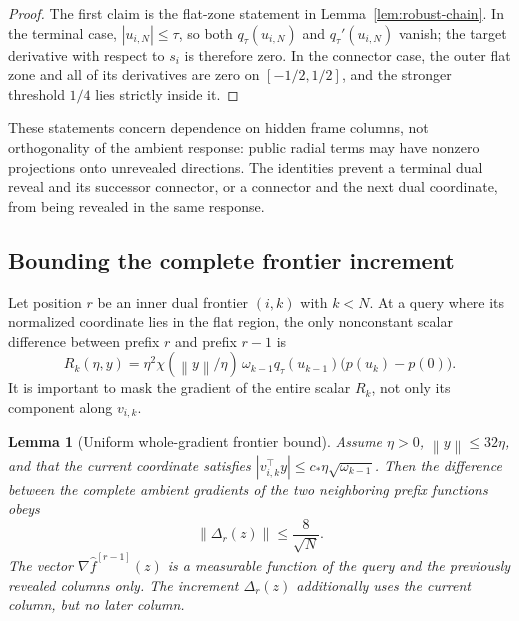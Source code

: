 \documentclass[11pt,a4paper]{article}
\newcommand{\norm}[1]{\left\lVert #1\right\rVert}
\newtheorem{lemma}[theorem]{Lemma}
\theoremstyle{definition}
\theoremstyle{remark}
\numberwithin{equation}{section}
\begin{document}
\begin{proof}
The first claim is the flat-zone statement in Lemma~\ref{lem:robust-chain}.  In the terminal case, $|u_{i,N}|\le\tau$, so both $q_\tau(u_{i,N})$ and $q_\tau'(u_{i,N})$ vanish; the target derivative with respect to $s_i$ is therefore zero.  In the connector case, the outer flat zone and all of its derivatives are zero on $[-1/2,1/2]$, and the stronger threshold $1/4$ lies strictly inside it.
\end{proof}

These statements concern dependence on hidden frame columns, not
orthogonality of the ambient response: public radial terms may have
nonzero projections onto unrevealed directions. The identities prevent
a terminal dual reveal and its successor connector, or a connector and
the next dual coordinate, from being revealed in the same response.

\subsection{Bounding the complete frontier increment}
\label{sec:increment}

Let position $r$ be an inner dual frontier $(i,k)$ with $k<N$.
At a query where its normalized coordinate lies in the flat region,
the only nonconstant scalar difference between prefix $r$ and prefix
$r-1$ is
\begin{equation}
 R_k(\eta,y)
 =\eta^2\chi(\norm y/\eta)\,
 \omega_{k-1}q_\tau(u_{k-1})
 \bigl(p(u_k)-p(0)\bigr).
 \label{eq:Rk}
\end{equation}
It is important to mask the gradient of the entire scalar $R_k$, not only its component along $v_{i,k}$.

\begin{lemma}[Uniform whole-gradient frontier bound]
\label{lem:frontier-bound}
Assume $\eta>0$, $\norm y\le32\eta$, and that the current coordinate satisfies
$|v_{i,k}^\top y|\le c_*\eta\sqrt{\omega_{k-1}}$.  Then the difference between the complete ambient gradients of the two neighboring prefix functions obeys
\begin{equation}
 \norm{\Delta_r(z)}\le\frac{8}{\sqrt N}.
 \label{eq:increment-unscaled}
\end{equation}
The vector $\nabla\widehat f^{[r-1]}(z)$ is a measurable function of
the query and the previously revealed columns only. The increment
$\Delta_r(z)$ additionally uses the current column, but no later column.
\end{lemma}
\end{document}
